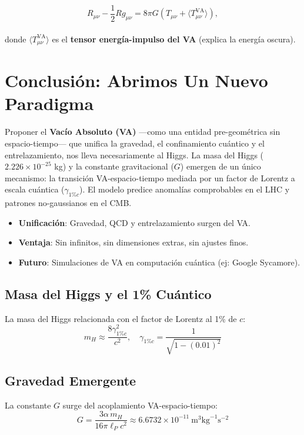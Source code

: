 \documentclass[a4paper]{article}
\theoremstyle{definition}
\theoremstyle{remark}
\numberwithin{equation}{section}
\begin{document}
	\[
	R_{\mu\nu} - \frac{1}{2} R g_{\mu\nu} = 8\pi G \left( T_{\mu\nu} + \langle T^{\text{VA}}_{\mu\nu} \rangle \right),
	\]\\
	
	donde \(\langle T^{\text{VA}}_{\mu\nu} \rangle\) es el \textbf{tensor energía-impulso del VA} (explica la energía oscura).
	
	
	\section{Conclusión: Abrimos Un Nuevo Paradigma}			
	\noindent
	Proponer el \textbf{Vacío Absoluto (VA)} —como una entidad pre-geométrica sin espacio-tiempo— que unifica la gravedad, el confinamiento cuántico y el entrelazamiento, nos lleva necesariamente al Higgs. La masa del Higgs ($2.226\times10^{-25}$ kg) y la constante gravitacional ($G$) emergen de un único mecanismo: la transición VA-espacio-tiempo mediada por un factor de Lorentz a escala cuántica ($\gamma_{1\%c}$). El modelo predice anomalías comprobables en el LHC y patrones no-gaussianos en el CMB.
	\begin{itemize}
		\item \textbf{Unificación}: Gravedad, QCD y entrelazamiento surgen del VA.
		\item \textbf{Ventaja}: Sin infinitos, sin dimensiones extras, sin ajustes finos.
		\item \textbf{Futuro}: Simulaciones de VA en computación cuántica (ej: Google Sycamore).
	\end{itemize}
	
	
	\subsection{Masa del Higgs y el 1\% Cuántico}
	La masa del Higgs relacionada con el factor de Lorentz al 1\% de $c$:
	\begin{equation}
		m_H \approx \dfrac{8\gamma_{1\%c}^2}{c^2}, \quad \gamma_{1\%c} = \dfrac{1}{\sqrt{1-(0.01)^2}}
	\end{equation}
	
	\subsection{Gravedad Emergente}
	La constante $G$ surge del acoplamiento VA-espacio-tiempo:
	\begin{equation}
		G = \dfrac{3\alpha\, m_H}{16\pi \ell_P c^2} \approx 6.6732\times10^{-11} \ \text{m}^3\text{kg}^{-1}\text{s}^{-2}
	\end{equation}	
	
\end{document}
